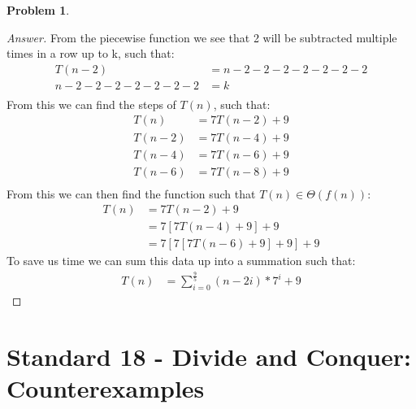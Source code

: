 \documentclass[11pt]{article}
\theoremstyle{definition}
\theoremstyle{definition}
\newtheorem{required}{Problem}
\theoremstyle{definition}
\begin{document}
\begin{required}
\begin{enumerate}
\begin{proof}[Answer] 
From the piecewise function we see that 2 will be subtracted multiple times in a row up to k, such that: \\
\begin{align*}
T(n-2) &= n - 2 - 2 - 2 - 2 - 2 - 2 - 2 \\
n - 2 - 2 - 2 - 2 - 2 - 2 - 2 &= k \\
\end{align*}
From this we can find the steps of $T(n)$, such that: \\
\begin{align*}
T(n) &= 7T(n-2) + 9  \\
T(n-2) &= 7T(n-4) + 9 \\
T(n-4) &= 7T(n-6) + 9 \\
T(n-6) &= 7T(n-8) + 9 \\
\end{align*}
From this we can then find the function such that $T(n) \in \Theta(f(n))$: \\
\begin{align*}
T(n) &= 7T(n-2) + 9  \\
&= 7[7T(n-4) + 9] +9 \\
&= 7[7[7T(n-6) + 9] +9] + 9
\end{align*}
To save us time we can sum this data up into a summation such that: \\
\begin{align*}
T(n) &= \sum_{i=0}^{\frac{9}{5}} (n-2i) * 7^{i} + 9
\end{align*}
\end{proof}
\end{enumerate}
\end{required}

\newpage
\section{Standard 18 - Divide and Conquer: Counterexamples}
\end{document}
